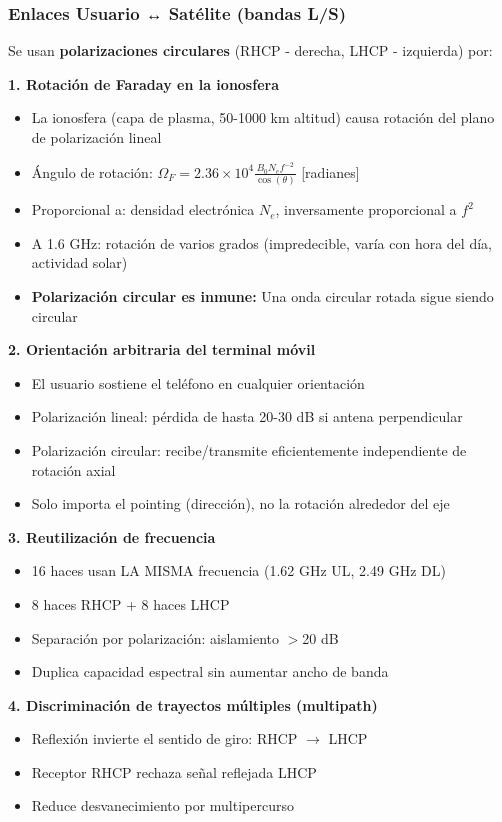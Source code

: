 \documentclass[a4paper,11pt]{article}
\begin{document}
\subsubsection*{Enlaces Usuario ↔ Satélite (bandas L/S)}

Se usan \textbf{polarizaciones circulares} (RHCP - derecha, LHCP - izquierda) por:

\textbf{1. Rotación de Faraday en la ionosfera}
\begin{itemize}
    \item La ionosfera (capa de plasma, 50-1000 km altitud) causa rotación del plano de polarización lineal
    \item Ángulo de rotación: $\Omega_F = 2.36 \times 10^4 \frac{B_0 N_e f^{-2}}{\cos(\theta)}$ [radianes]
    \item Proporcional a: densidad electrónica $N_e$, inversamente proporcional a $f^2$
    \item A 1.6 GHz: rotación de varios grados (impredecible, varía con hora del día, actividad solar)
    \item \textbf{Polarización circular es inmune:} Una onda circular rotada sigue siendo circular
\end{itemize}

\textbf{2. Orientación arbitraria del terminal móvil}
\begin{itemize}
    \item El usuario sostiene el teléfono en cualquier orientación
    \item Polarización lineal: pérdida de hasta 20-30 dB si antena perpendicular
    \item Polarización circular: recibe/transmite eficientemente independiente de rotación axial
    \item Solo importa el pointing (dirección), no la rotación alrededor del eje
\end{itemize}

\textbf{3. Reutilización de frecuencia}
\begin{itemize}
    \item 16 haces usan LA MISMA frecuencia (1.62 GHz UL, 2.49 GHz DL)
    \item 8 haces RHCP + 8 haces LHCP
    \item Separación por polarización: aislamiento $>$20 dB
    \item Duplica capacidad espectral sin aumentar ancho de banda
\end{itemize}

\textbf{4. Discriminación de trayectos múltiples (multipath)}
\begin{itemize}
    \item Reflexión invierte el sentido de giro: RHCP $\rightarrow$ LHCP
    \item Receptor RHCP rechaza señal reflejada LHCP
    \item Reduce desvanecimiento por multipercurso
\end{itemize}
\end{document}
